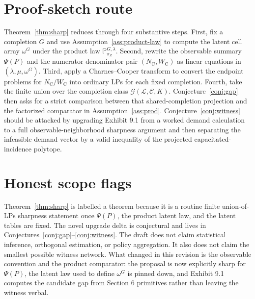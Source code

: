 \documentclass[11pt]{article}
\renewcommand{\Pr}{\mathbb{P}}
\newcommand{\calG}{\mathcal{G}}
\newcommand{\PsiObs}{\Psi}
\theoremstyle{definition}
\theoremstyle{plain}
\theoremstyle{remark}
\begin{document}
\section{Proof-sketch route}
Theorem~\ref{thm:sharp} reduces through four substantive steps. First, fix a
completion \(G\) and use Assumption~\ref{ass:product-law} to compute the latent
cell array \(\omega^G\) under the product law
\(\Pr^{G,\lambda}_{\pi_Z}\). Second, rewrite the observable summary
\(\PsiObs(P)\) and the numerator-denominator pair
\((N_{\mathrm C},W_{\mathrm C})\) as linear equations in
\((\lambda,\mu,\omega^G)\). Third, apply a Charnes--Cooper transform to convert
the endpoint problems for \(N_{\mathrm C}/W_{\mathrm C}\) into ordinary LPs for
each fixed completion. Fourth, take the finite union over the completion class
\(\calG(\mathcal L,\mathcal C,K)\). Conjecture~\ref{conj:gap} then asks for a
strict comparison between that shared-completion projection and the factorized
comparator in Assumption~\ref{ass:prod}. Conjecture~\ref{conj:witness} should
be attacked by upgrading Exhibit 9.1 from a worked demand calculation to a full
observable-neighborhood sharpness argument and then separating the infeasible
demand vector by a valid inequality of the projected capacitated-incidence
polytope.

\section{Honest scope flags}
Theorem~\ref{thm:sharp} is labelled a theorem because it is a routine finite
union-of-LPs sharpness statement once \(\PsiObs(P)\), the product latent law,
and the latent tables are fixed. The
novel upgrade delta is conjectural and lives in
Conjectures~\ref{conj:gap}--\ref{conj:witness}. The draft does not claim
statistical inference, orthogonal estimation, or policy aggregation. It also
does not claim the smallest possible witness network. What changed in this
revision is the observable convention and the product comparator: the proposal
is now explicitly sharp for \(\PsiObs(P)\), the latent law used to define
\(\omega^G\) is pinned down, and Exhibit 9.1 computes the candidate gap from
Section 6 primitives rather than leaving the witness verbal.
\end{document}
